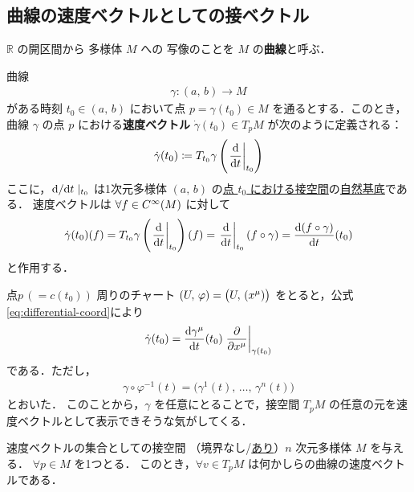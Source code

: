 \documentclass[geometry_main]{subfiles}
\begin{document}

\subsection{曲線の速度ベクトルとしての接ベクトル}

$\mathbb{R}$ の開区間から \cinfty 多様体 $M$ への \cinfty 写像のことを $M$ の\textbf{\cinfty 曲線}と呼ぶ．

\cinfty 曲線
\begin{align}
	\gamma \colon (a,\, b) \to M
\end{align}
がある時刻 $t_0 \in (a,\, b)$ において点 $p = \gamma(t_0) \in M$ を通るとする．このとき，曲線 $\gamma$ の点 $p$ における\textbf{速度ベクトル} $\dot{\gamma}(t_0) \in T_p M$ が次のように定義される：
\begin{align}
	\label{def.curve}
	\dot{\gamma}(t_0) \coloneqq T_{t_0} \gamma \left( \eval{\dv{}{t}}_{t_0} \right)
\end{align}
ここに，$\dv*{}{t}|_{t_0}$ は1次元\cinfty 多様体 $(a,\, b)$ の\hyperref[def.tangentv]{点 $t_0$ における接空間}の\hyperref[naturalbasis]{自然基底}である．
速度ベクトルは $\forall f \in C^\infty(M)$ に対して
\begin{align}
	\dot{\gamma}(t_0) (f) = T_{t_0} \gamma \left( \eval{\dv{}{t}}_{t_0} \right)(f) = \eval{\dv{}{t}}_{t_0} (f \circ \gamma) = \dv{(f \circ \gamma)}{t}()(t_0)
\end{align}
と作用する．

点$p \,(= c(t_0))$ 周りのチャート $(U,\, \varphi) = \bigl(U,\, (x^\mu)\bigr)$ をとると，公式\eqref{eq:differential-coord}により
\begin{align}
	\label{eq:velocity}
	\dot{\gamma} (t_0) = \dv{\gamma^\mu}{t}()(t_0) \eval{\pdv{}{x^\mu}}_{\gamma(t_0)}
\end{align}
である．ただし，
\begin{align}
	\gamma \circ \varphi^{-1} (t) = \bigl( \gamma^1(t),\, \dots ,\, \gamma^n(t) \bigr) 
\end{align}
とおいた．
このことから，$\gamma$ を任意にとることで，接空間 $T_p M$ の任意の元を速度ベクトルとして表示できそうな気がしてくる．

\begin{myprop}[label=prop:tangent-velocity]{速度ベクトルの集合としての接空間}
	（境界なし/\hyperref[def:mani-with-boundary]{あり}）$n$ 次元\cinfty 多様体 $M$ を与える．
	$\forall p \in M$ を1つとる．
	このとき，$\forall v \in T_p M$ は何かしらの\cinfty 曲線の速度ベクトルである．
\end{myprop}
\end{document}
